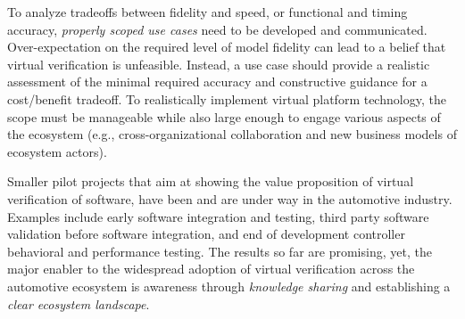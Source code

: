 
To analyze tradeoffs between fidelity and speed, or functional and timing accuracy, \emph{properly scoped use cases} need to be developed and communicated.
Over-expectation on the required level of model fidelity can lead to a belief that virtual verification is unfeasible.
Instead, a use case should provide a realistic assessment of the minimal required accuracy 
and %
constructive guidance for a cost/benefit tradeoff.
To realistically implement virtual platform technology, the scope must be manageable while also large enough to engage various aspects of the ecosystem (e.g., cross-organizational collaboration and new business models of ecosystem actors).


Smaller %
pilot projects that aim at showing the value proposition of virtual verification of software, have been and are under way in the automotive industry.
Examples include early software integration and testing, third party software %
validation before software integration, and end of development controller behavioral and performance testing.
The results so far are promising, yet, the major enabler to the widespread adoption of virtual verification across the automotive ecosystem is awareness through \emph{knowledge sharing} and establishing a \emph{clear ecosystem landscape}.

